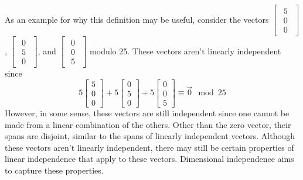 \documentclass[a4paper, 12pt, reqno]{amsart}
\begin{document}
		As an example for why this definition may be useful, consider the vectors 
		$
		\begin{bmatrix}
			\begin{smallmatrix}
				5 \\
				0 \\
				0
			\end{smallmatrix}
		\end{bmatrix}
		$, $
		\begin{bmatrix}
			\begin{smallmatrix}
				0 \\
				5 \\
				0
			\end{smallmatrix}
		\end{bmatrix}
		$, and $
		\begin{bmatrix}
			\begin{smallmatrix}
				0 \\
				0 \\
				5
			\end{smallmatrix}
		\end{bmatrix}
		$ modulo 25. These vectors aren't linearly independent since
		\[
			5\begin{bmatrix}
				5 \\
				0 \\
				0
			\end{bmatrix} + 
			5\begin{bmatrix}
				0 \\
				5 \\
				0
			\end{bmatrix} + 
			5\begin{bmatrix}
				0 \\
				0 \\
				5
			\end{bmatrix} \equiv \vec{0} \mod{25}
		\]
		However, in some sense, these vectors are still independent since one cannot be made from a linear combination of the others. Other than the zero vector, their
		spans are disjoint, similar to the spans of linearly independent vectors. Although these vectors aren't linearly independent, there may still be certain properties
		of linear independence that apply to these vectors. Dimensional independence aims to capture these properties.
		
\end{document}

